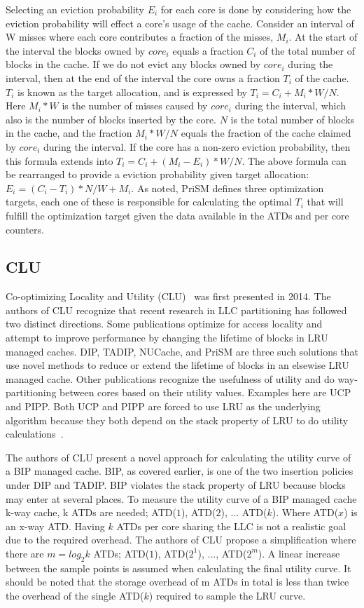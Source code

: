 Selecting an eviction probability $E_i$ for each core is done by considering how the eviction probability will effect a core's usage of the cache.
Consider an interval of W misses where each core contributes a fraction of the misses, $M_i$.
At the start of the interval the blocks owned by $core_i$ equals a fraction $C_i$ of the total number of blocks in the cache.
If we do not evict any blocks owned by $core_i$ during the interval, then at the end of the interval the core owns a fraction $T_i$ of the cache.
$T_i$ is known as the target allocation, and is expressed by $T_i = C_i + M_i * W/N$. 
Here $M_i * W$ is the number of misses caused by $core_i$ during the interval, which also is the number of blocks inserted by the core.
$N$ is the total number of blocks in the cache, and the fraction $M_i * W/N$ equals the fraction of the cache claimed by $core_i$ during the interval.
If the core has a non-zero eviction probability, then this formula extends into $T_i = C_i + (M_i - E_i) * W/N$.
The above formula can be rearranged to provide a eviction probability given target allocation: $E_i = (C_i - T_i) * N/W + M_i$.
As noted, PriSM defines three optimization targets, each one of these is responsible for calculating the optimal $T_i$ that will fulfill the optimization target given the data available in the ATDs and per core counters.

\subsection{CLU}

Co-optimizing Locality and Utility (CLU)~\cite{Zhan2014} was first presented in 2014.
The authors of CLU recognize that recent research in LLC partitioning has followed two distinct directions.
Some publications optimize for access locality and attempt to improve performance by changing the lifetime of blocks in LRU managed caches.
DIP, TADIP, NUCache, and PriSM are three such solutions that use novel methods to reduce or extend the lifetime of blocks in an elsewise LRU managed cache.
Other publications recognize the usefulness of utility and do way-partitioning between cores based on their utility values.
Examples here are UCP and PIPP.
Both UCP and PIPP are forced to use LRU as the underlying algorithm because they both depend on the stack property of LRU to do utility calculations~\cite{Qureshi2006, Xie2009}.

The authors of CLU present a novel approach for calculating the utility curve of a BIP managed cache.
BIP, as covered earlier, is one of the two insertion policies under DIP and TADIP. 
BIP violates the stack property of LRU because blocks may enter at several places.
To measure the utility curve of a BIP managed cache k-way cache, k ATDs are needed; ATD($1$), ATD($2$), ... ATD($k$). 
Where ATD($x$) is an x-way ATD.
Having $k$ ATDs per core sharing the LLC is not a realistic goal due to the required overhead.
The authors of CLU propose a simplification where there are $m = log_2 k$ ATDs; ATD($1$), ATD($2^1$), ..., ATD($2^m$).
A linear increase between the sample points is assumed when calculating the final utility curve.
It should be noted that the storage overhead of m ATDs in total is less than twice the overhead of the single ATD($k$) required to sample the LRU curve.

